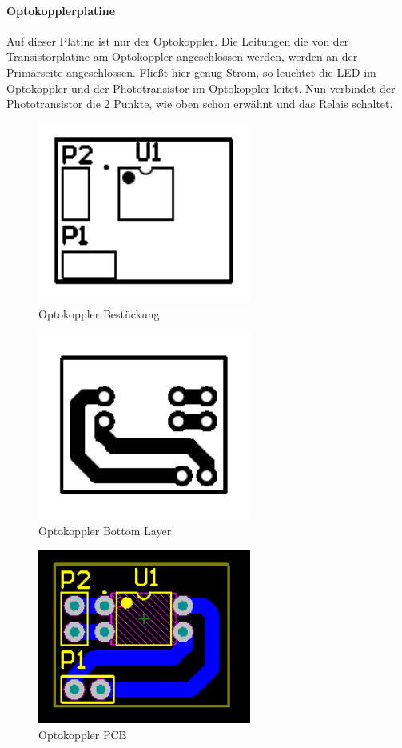 \paragraph{Optokopplerplatine}
Auf dieser Platine ist nur der Optokoppler. Die Leitungen die von der Transistorplatine am Optokoppler angeschlossen werden, werden an der Primärseite angeschlossen. Fließt hier genug Strom, so leuchtet die LED im Optokoppler und der Phototransistor im Optokoppler leitet. Nun verbindet der Phototransistor die 2 Punkte, wie oben schon erwähnt und das Relais schaltet.\\
\begin{figure}[H]
\centering
\includegraphics[keepaspectratio=true, width=7cm]{images/rpi/Optokoppler_Bestueckung.png}
\caption{Optokoppler Bestückung}
\label{fig:report_hardware_OptBest}
\end{figure}
\begin{figure}[H]
\centering
\includegraphics[keepaspectratio=true, width=7cm]{images/rpi/Optokoppler_BottomLayer.png}
\caption{Optokoppler Bottom Layer}
\label{fig:report_hardware_OptBL}
\end{figure}
\begin{figure}[H]
\centering
\includegraphics[keepaspectratio=true, width=7cm]{images/rpi/Optokoppler_PCB.png}
\caption{Optokoppler PCB}
\label{fig:report_hardware_OptPCB}
\end{figure}
